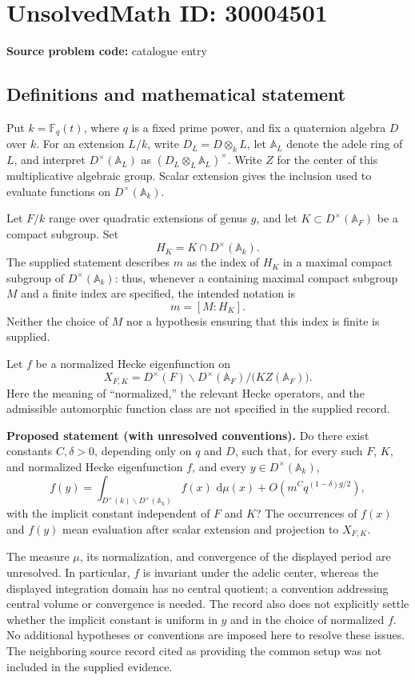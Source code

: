 \documentclass[11pt]{article}
\newcommand{\F}{\mathbb{F}}
\newcommand{\A}{\mathbb{A}}
\newcommand{\dd}{\,\mathrm{d}}
\begin{document}
\section*{UnsolvedMath ID: 30004501}
\textbf{Source problem code:} catalogue entry
\subsection{Definitions and mathematical statement}
Put \(k=\F_q(t)\), where \(q\) is a fixed prime power, and fix a quaternion algebra \(D\) over \(k\). For an extension \(L/k\), write \(D_L=D\otimes_k L\), let \(\A_L\) denote the adele ring of \(L\), and interpret \(D^\times(\A_L)\) as \((D_L\otimes_L\A_L)^\times\). Write \(Z\) for the center of this multiplicative algebraic group. Scalar extension gives the inclusion used to evaluate functions on \(D^\times(\A_k)\).

Let \(F/k\) range over quadratic extensions of genus \(g\), and let \(K\subset D^\times(\A_F)\) be a compact subgroup. Set
\[
H_K=K\cap D^\times(\A_k).
\]
The supplied statement describes \(m\) as the index of \(H_K\) in a maximal compact subgroup of \(D^\times(\A_k)\): thus, whenever a containing maximal compact subgroup \(M\) and a finite index are specified, the intended notation is
\[
m=[M:H_K].
\]
Neither the choice of \(M\) nor a hypothesis ensuring that this index is finite is supplied.

Let \(f\) be a normalized Hecke eigenfunction on
\[
X_{F,K}=D^\times(F)\backslash D^\times(\A_F)
       /\bigl(KZ(\A_F)\bigr).
\]
Here the meaning of ``normalized,'' the relevant Hecke operators, and the admissible automorphic function class are not specified in the supplied record.

\textbf{Proposed statement (with unresolved conventions).}
Do there exist constants \(C,\delta>0\), depending only on \(q\) and \(D\), such that, for every such \(F\), \(K\), and normalized Hecke eigenfunction \(f\), and every \(y\in D^\times(\A_k)\),
\[
f(y)=
\int_{D^\times(k)\backslash D^\times(\A_k)}
       f(x)\,\dd\mu(x)
+O\!\left(m^Cq^{(1-\delta)g/2}\right),
\]
with the implicit constant independent of \(F\) and \(K\)? The occurrences of \(f(x)\) and \(f(y)\) mean evaluation after scalar extension and projection to \(X_{F,K}\).

The measure \(\mu\), its normalization, and convergence of the displayed period are unresolved. In particular, \(f\) is invariant under the adelic center, whereas the displayed integration domain has no central quotient; a convention addressing central volume or convergence is needed. The record also does not explicitly settle whether the implicit constant is uniform in \(y\) and in the choice of normalized \(f\). No additional hypotheses or conventions are imposed here to resolve these issues. The neighboring source record cited as providing the common setup was not included in the supplied evidence.
\end{document}
